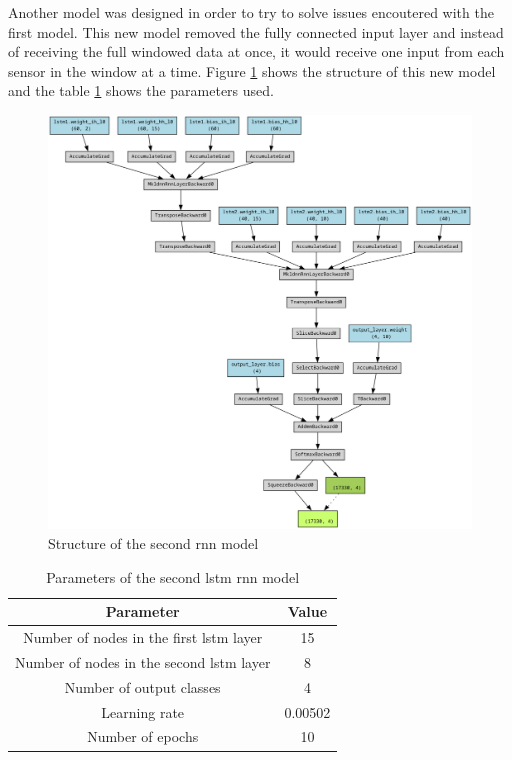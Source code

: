 Another model was designed in order to try to solve issues encoutered with the first model. This new model removed the fully connected
input layer and instead of receiving the full windowed data at once, it would receive one input from each sensor in the window at a time.
Figure \ref{fig:rnn_struct2} shows the structure of this new model and the table \ref{table:rnn_params2} shows the parameters used.

\begin{figure}[h]
    \centering
    \includegraphics[scale=0.21]{images/rnn_struct_2.png}
    \caption{Structure of the second \acrshort{rnn} model}
    \label{fig:rnn_struct2}
\end{figure}

\begin{table}[h]
    \centering
    \begin{tabular}{|c|c|}
        \hline
        \textbf{Parameter} & \textbf{Value} \\ \hline
        Number of nodes in the first \acrshort{lstm} layer & 15 \\ \hline
        Number of nodes in the second \acrshort{lstm} layer & 8 \\ \hline
        Number of output classes & 4 \\ \hline
        Learning rate & 0.00502 \\ \hline
        Number of epochs & 10 \\ \hline
    \end{tabular}
    \caption{Parameters of the second \acrshort{lstm} \acrshort{rnn} model}
    \label{table:rnn_params2}
\end{table}

